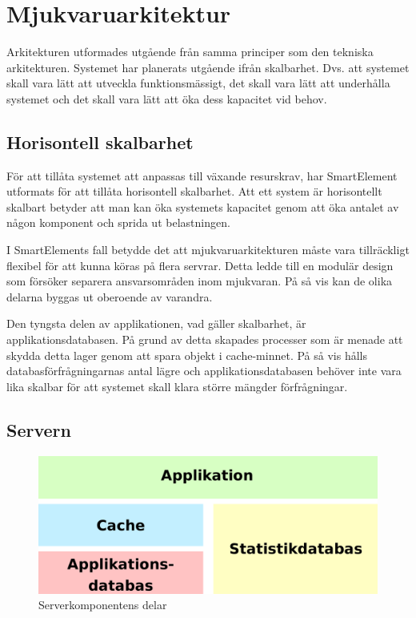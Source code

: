 \section{Mjukvaruarkitektur}

Arkitekturen utformades utgående från samma principer som den tekniska arkitekturen. Systemet har planerats utgående ifrån skalbarhet. Dvs. att systemet skall vara lätt att utveckla funktionsmässigt, det skall vara lätt att underhålla systemet och det skall vara lätt att öka dess kapacitet vid behov. \citep[s. 203]{scalableweb}

\subsection{Horisontell skalbarhet}

För att tillåta systemet att anpassas till växande resurskrav, har SmartElement utformats för att tillåta horisontell skalbarhet. Att ett system är horisontellt skalbart betyder att man kan öka systemets kapacitet genom att öka antalet av någon komponent och sprida ut belastningen. \citep[s. 205-207]{scalableweb}

I SmartElements fall betydde det att mjukvaruarkitekturen måste vara tillräckligt flexibel för att kunna köras på flera servrar. Detta ledde till en modulär design som försöker separera ansvarsområden inom mjukvaran. På så vis kan de olika delarna byggas ut oberoende av varandra.

Den tyngsta delen av applikationen, vad gäller skalbarhet, är applikationsdatabasen. På grund av detta skapades processer som är menade att skydda detta lager genom att spara objekt i cache-minnet. På så vis hålls databasförfrågningarnas antal lägre och applikationsdatabasen behöver inte vara lika skalbar för att systemet skall klara större mängder förfrågningar.

\subsection{Servern}

\begin{figure}[h!]
\centering
\includegraphics[width=120mm]{assets/images/smelementbackendparts.png}
\caption{Serverkomponentens delar}
\label{abstractbackend}
\end{figure}

